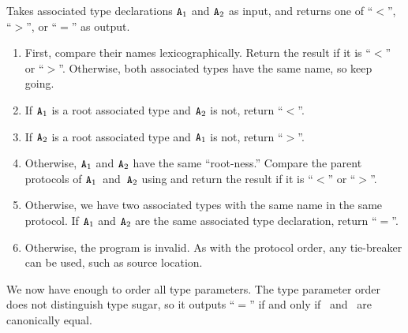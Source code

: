 \documentclass[../generics]{subfiles}
\begin{document}
%
\begin{algorithm}\label{associated type order}%
Takes associated type declarations $\texttt{A}_1$ and $\texttt{A}_2$ as input, and returns one of ``$<$'', ``$>$'', or ``$=$'' as output.
\begin{enumerate}
\item First, compare their names lexicographically. Return the result if it is ``$<$'' or ``$>$''. Otherwise, both associated types have the same name, so keep going.
\item If $\texttt{A}_1$ is a root associated type and $\texttt{A}_2$ is not, return ``$<$''.
\item If $\texttt{A}_2$ is a root associated type and $\texttt{A}_1$ is not, return ``$>$''.
\item Otherwise, $\texttt{A}_1$ and $\texttt{A}_2$ have the same ``root-ness.'' Compare the parent protocols of $\texttt{A}_1$~and~$\texttt{A}_2$ using  and return the result if it is ``$<$'' or ``$>$''.
\item Otherwise, we have two associated types with the same name in the same protocol. If $\texttt{A}_1$ and $\texttt{A}_2$ are the same associated type declaration, return ``$=$''.
\item Otherwise, the program is invalid. As with the protocol order, any tie-breaker can be used, such as source location.
\end{enumerate}
\end{algorithm}

We now have enough to order all type parameters. The type parameter order does not distinguish type sugar, so it outputs ``$=$'' if and only if \tT\ and \tU\ are canonically equal.
\end{document}
